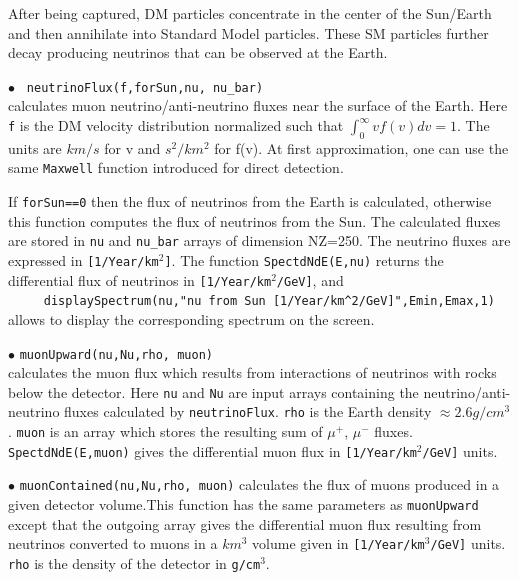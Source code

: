 \documentclass[12pt,a4paper]{article}
\begin{document}
After being captured, DM particles concentrate in the center of the Sun/Earth and 
then  annihilate into Standard Model particles. These SM particles further decay producing neutrinos that can be 
observed at the Earth.   

\noindent
$\bullet$ \verb| neutrinoFlux(f,forSun,nu, nu_bar)|\\
calculates muon neutrino/anti-neutrino  fluxes  near the surface of the Earth. 
Here  \verb|f|  is  the DM velocity distribution   normalized such that 
$ \int_0^{\infty} v f(v) dv =1$. The units  are $km/s$ for v and $s^2/km^2$ for  
f(v). At first approximation,   one can use the same  \verb|Maxwell| 
function introduced for direct detection.
  
  If {\tt forSun==0} then the flux of neutrinos from the Earth is calculated, otherwise this function computes the flux of neutrinos from the Sun.  The calculated fluxes are stored in {\tt nu} and {\tt nu\_bar}  arrays of dimension NZ=250.  
The neutrino fluxes are expressed in \verb|[1/Year/km|$^2$\verb|]|.
 The function
{\tt SpectdNdE(E,nu)} returns the differential flux of neutrinos in 
\verb|[1/Year/km|$^2$\verb|/GeV]|, and \\
\verb|     displaySpectrum(nu,"nu from Sun [1/Year/km^2/GeV]",Emin,Emax,1)|\\
allows to display the corresponding spectrum on the screen.    




\noindent
$\bullet$ \verb|muonUpward(nu,Nu,rho, muon)|\\
calculates the muon flux which results from interactions of
neutrinos with rocks below the detector. Here  {\tt nu} and {\tt Nu} are input arrays containing the
neutrino/anti-neutrino fluxes calculated by {\tt neutrinoFlux}. 
{\tt rho} is  the Earth density $\approx 2.6g/cm^3$. {\tt muon} is an
array which stores the resulting sum of $\mu^+$, $\mu^-$ fluxes. {\tt SpectdNdE(E,muon)}  gives the
differential muon flux  in \verb|[1/Year/km|$^2$\verb|/GeV]| units.  
 

\noindent $\bullet$ \verb|muonContained(nu,Nu,rho, muon)|
calculates  the flux  of muons  produced in a given detector volume.This function  has the same parameters as \verb|muonUpward| 
except that the  outgoing  array gives the differential muon flux resulting from neutrinos converted to muons 
in a  $km^3$ volume given  in \verb|[1/Year/km|$^3$\verb|/GeV]| units.  \verb|rho| is the density of the detector in 
\verb|g/cm|$^3$.
\end{document}
